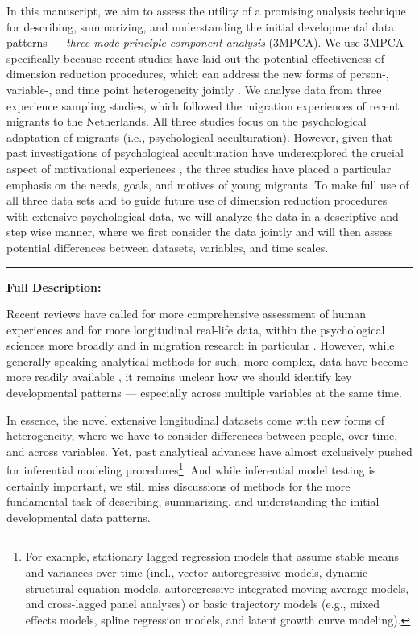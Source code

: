 \documentclass[]{article}
\let\rmarkdownfootnote\footnote%
\def\footnote{\protect\rmarkdownfootnote}
\begin{document}
In this manuscript, we aim to assess the utility of a promising analysis
technique for describing, summarizing, and understanding the initial
developmental data patterns ---
\textit{three-mode principle component analysis} (3MPCA). We use 3MPCA
specifically because recent studies have laid out the potential
effectiveness of dimension reduction procedures, which can address the
new forms of person-, variable-, and time point heterogeneity jointly
\citep[e.g.,][]{Monden2015}. We analyse data from three experience
sampling studies, which followed the migration experiences of recent
migrants to the Netherlands. All three studies focus on the
psychological adaptation of migrants (i.e., psychological
acculturation). However, given that past investigations of psychological
acculturation have underexplored the crucial aspect of motivational
experiences \citep{Kreienkamp2022d}, the three studies have placed a
particular emphasis on the needs, goals, and motives of young migrants.
To make full use of all three data sets and to guide future use of
dimension reduction procedures with extensive psychological data, we
will analyze the data in a descriptive and step wise manner, where we
first consider the data jointly and will then assess potential
differences between datasets, variables, and time scales.

\begin{center}\rule{0.5\linewidth}{0.5pt}\end{center}

\textbf{Full Description:}

Recent reviews have called for more comprehensive assessment of human
experiences and for more longitudinal real-life data, within the
psychological sciences more broadly and in migration research in
particular
\citep[e.g.,][]{Kreienkamp2022d, MacInnis2015, McKeown2017, Pettigrew2011, Ward2019}.
However, while generally speaking analytical methods for such, more
complex, data have become more readily available
\citep[e.g.,][]{ODonnell2021}, it remains unclear how we should identify
key developmental patterns --- especially across multiple variables at
the same time.

In essence, the novel extensive longitudinal datasets come with new
forms of heterogeneity, where we have to consider differences between
people, over time, and across variables. Yet, past analytical advances
have almost exclusively pushed for inferential modeling
procedures\footnote{For example, stationary lagged regression models
  that assume stable means and variances over time (incl., vector
  autoregressive models, dynamic structural equation models,
  autoregressive integrated moving average models, and cross-lagged
  panel analyses) or basic trajectory models (e.g., mixed effects
  models, spline regression models, and latent growth curve modeling).}.
And while inferential model testing is certainly important, we still
miss discussions of methods for the more fundamental task of describing,
summarizing, and understanding the initial developmental data patterns.
\end{document}
